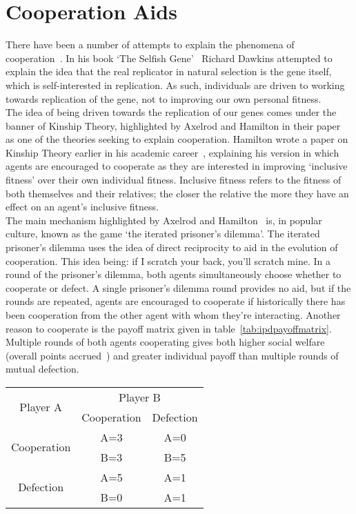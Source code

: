 \documentclass[]{final_report}
\begin{document}
\section{Cooperation Aids}
There have been a number of attempts to explain the phenomena of cooperation~\cite{kropotkin1902mutual, selfish_gene, evolution_of_cooperation, five_rules_coop}. In his book `The Selfish Gene'~\cite{selfish_gene} Richard Dawkins attempted to explain the idea that the real replicator in natural selection is the gene itself, which is self-interested in replication. As such, individuals are driven to working towards replication of the gene, not to improving our own personal fitness.\\
The idea of being driven towards the replication of our genes comes under the banner of Kinship Theory, highlighted by Axelrod and Hamilton in their paper~\cite{evolution_of_cooperation} as one of the theories seeking to explain cooperation. Hamilton wrote a paper on Kinship Theory earlier in his academic career~\cite{kinhamilton}, explaining his version in which agents are encouraged to cooperate as they are interested in improving `inclusive fitness' over their own individual fitness. Inclusive fitness refers to the fitness of both themselves and their relatives; the closer the relative the more they have an effect on an agent's inclusive fitness.\\
The main mechanism highlighted by Axelrod and Hamilton~\cite{evolution_of_cooperation} is, in popular culture, known as the game `the iterated prisoner's dilemma'. The iterated prisoner's dilemma uses the idea of direct reciprocity to aid in the evolution of cooperation. This idea being: if I scratch your back, you'll scratch  mine. In a round of the prisoner's dilemma, both agents simultaneously choose whether to cooperate or defect. A single prisoner's dilemma round provides no aid, but if the rounds are repeated, agents are encouraged to cooperate if historically there has been cooperation from the other agent with whom they're interacting. Another reason to cooperate is the payoff matrix given in table~\ref{tab:ipdpayoffmatrix}. Multiple rounds of both agents cooperating gives both higher social welfare (overall points accrued~\cite{kostas_deductive}) and greater individual payoff than multiple rounds of mutual defection.
\begin{framed}
	\begin{center}
		\begin{tabular}{c|c|c}
		\multirow{2}{*}{Player A} & \multicolumn{2}{c}{Player B}\\		
		& Cooperation & Defection\\
		\hline
		\multirow{2}{*}{Cooperation} & A=3 & A=0\\
		& B=3 & B=5\\
		\hline
		\multirow{2}{*}{Defection} & A=5 & A=1\\
		& B=0 & A=1\\
		\end{tabular}
		\label{tab:ipdpayoffmatrix}
	\end{center}	
\end{framed}
\end{document}

